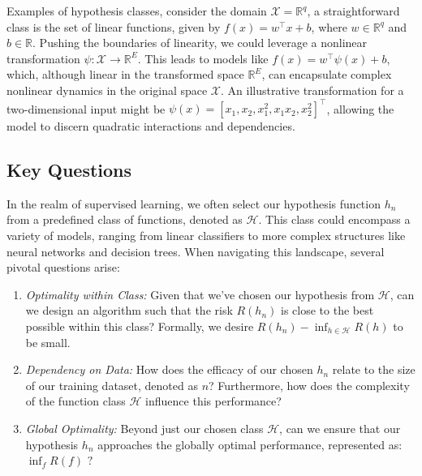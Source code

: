 \documentclass[11pt]{article}
\begin{document}
    \begin{example}
        Examples of hypothesis classes, consider the domain $\mathcal{X}=\mathbb{R}^q$, a straightforward class is the set of linear functions, given by $f(x) = w^{\top}x + b$, where $w \in \mathbb{R}^q$ and $b \in \mathbb{R}$. Pushing the boundaries of linearity, we could leverage a nonlinear transformation $\psi: \mathcal{X} \rightarrow \mathbb{R}^E$. This leads to models like $f(x)=w^{\top}\psi(x) + b$, which, although linear in the transformed space $\mathbb{R}^E$, can encapsulate complex nonlinear dynamics in the original space $\mathcal{X}$. An illustrative transformation for a two-dimensional input might be $\psi(x) = [x_1, x_2, x_1^2, x_1x_2, x_2^2]^{\top}$, allowing the model to discern quadratic interactions and dependencies.
    \end{example}

    \subsection{Key Questions}

    In the realm of supervised learning, we often select our hypothesis function $h_n$ from a predefined class of functions, denoted as $\mathcal{H}$. This class could encompass a variety of models, ranging from linear classifiers to more complex structures like neural networks and decision trees. When navigating this landscape, several pivotal questions arise:

    \begin{enumerate}
        \item \textit{Optimality within Class:} Given that we've chosen our hypothesis from $\mathcal{H}$, can we design an algorithm such that the risk $R(h_n)$ is close to the best possible within this class? Formally, we desire $R(h_n) - \inf_{h \in \mathcal{H}} R(h)$ to be small.

        \item \textit{Dependency on Data:} How does the efficacy of our chosen $h_n$ relate to the size of our training dataset, denoted as $n$? Furthermore, how does the complexity of the function class $\mathcal{H}$ influence this performance?

        \item \textit{Global Optimality:} Beyond just our chosen class $\mathcal{H}$, can we ensure that our hypothesis $h_n$ approaches the globally optimal performance, represented as:
        $\inf_{f} R(f) \text{ ?}$
    \end{enumerate}
\end{document}
